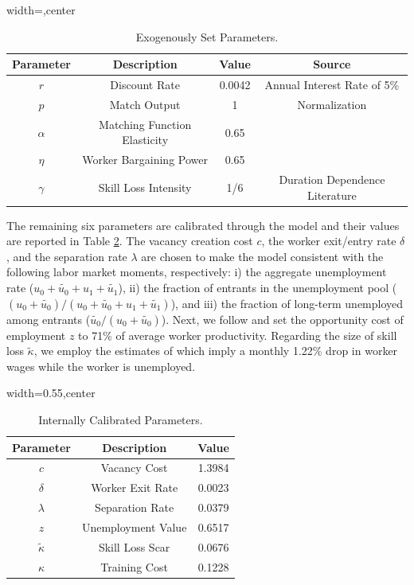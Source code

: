 \documentclass[12pt]{article} %
\theoremstyle{definition}
\begin{document}
\begin{table}[h!]
\centering 
\begin{adjustbox}{width=\columnwidth,center}
 \begin{tabular}{||c c c c||} 
 \hline
 \textbf{Parameter} & \textbf{Description} & \textbf{Value} & \textbf{Source} \\ 
 \hline\hline
  $r$ & Discount Rate & 0.0042 & Annual Interest Rate of 5\% \\ 
   $p$ & Match Output &  1 & Normalization \\
 $\alpha$ & Matching Function Elasticity & 0.65 & \cite{petrongolo2001looking} \\
   $\eta$ & Worker Bargaining Power  & 0.65 & \cite{shimer2005cyclical} \\
  $\gamma$ & Skill Loss Intensity & 1/6 &  Duration Dependence Literature \\ [1ex] 
 \hline
 \end{tabular}
\end{adjustbox}
\caption{Exogenously Set Parameters.} \label{table_set_parameters}
\end{table} 

The remaining six parameters are calibrated through the model and their values are reported in Table \ref{table_calibrated_parameters}.
The vacancy creation cost $c$, the worker exit/entry rate $\delta$, and the separation rate $\lambda$ are chosen to make the model consistent with the following labor market moments, respectively: i) the aggregate unemployment rate ($u_{0} + \tilde{u_{0}} + u_{1} + \tilde{u_{1}}$), ii) the fraction of entrants in the unemployment pool ($(u_{0} + \tilde{u_{0}})/(u_{0} + \tilde{u_{0}} + u_{1} + \tilde{u_{1}})$), and iii) the fraction of long-term unemployed among entrants ($\tilde{u_{0}}/(u_{0} + \tilde{u_{0}})$).
Next, we follow \cite{hall2008limited} and set the opportunity cost of employment $z$ to 71\% of average worker productivity.
Regarding the size of skill loss $\tilde{\kappa}$, we employ the estimates of \cite{ortego2016unemployment, ortego2017loss} which imply a monthly 1.22\% drop in worker wages while the worker is unemployed.

\begin{table}[h!]
\centering
\begin{adjustbox}{width=0.55\columnwidth,center}
 \begin{tabular}{||c c c||} 
 \hline
 \textbf{Parameter} & \textbf{Description} & \textbf{Value} \\  
 \hline\hline
  $c$ & Vacancy Cost & 1.3984  \\
  $\delta$  & Worker Exit Rate    & 0.0023   \\ 
  $\lambda$  & Separation Rate    & 0.0379  \\
  $z$ & Unemployment Value  & 0.6517  \\
  $ \tilde{\kappa}$  & Skill Loss Scar & 0.0676 \\ 
   $\kappa$  & Training Cost & 0.1228 \\ [1ex] 
 \hline
 \end{tabular}
\end{adjustbox}
  \caption{Internally Calibrated Parameters.} \label{table_calibrated_parameters}
\end{table}
\end{document}
